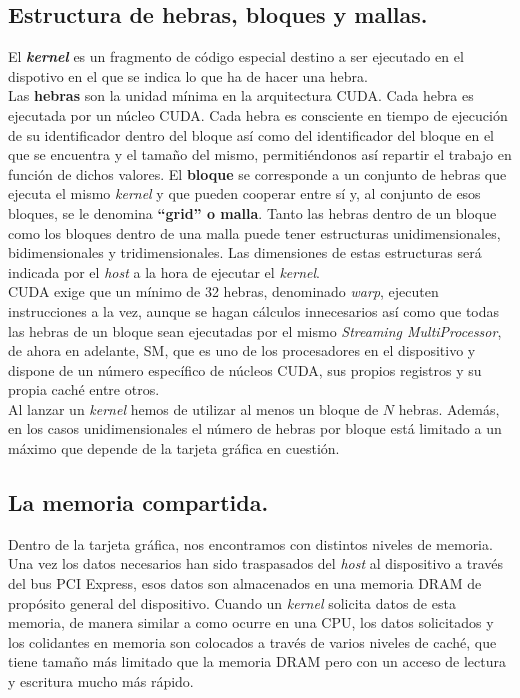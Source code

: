 \subsection{Estructura de hebras, bloques y mallas.}
El \textbf{\textit{kernel}} es un fragmento de código especial destino a ser ejecutado en el dispotivo en el que se indica lo que ha de hacer una hebra.\\

Las \textbf{hebras} son la unidad mínima en la arquitectura CUDA. Cada hebra es ejecutada por un núcleo CUDA. Cada hebra es consciente en tiempo de ejecución de su identificador dentro del bloque así como del identificador del bloque en el que se encuentra y el tamaño del mismo, permitiéndonos así repartir el trabajo en función de dichos valores. El \textbf{bloque} se corresponde a un conjunto de hebras que ejecuta el mismo \textit{kernel} y que pueden cooperar entre sí y, al conjunto de esos bloques, se le denomina \textbf{``grid'' o malla}. Tanto las hebras dentro de un bloque como los bloques dentro de una malla puede tener estructuras unidimensionales, bidimensionales y tridimensionales. Las dimensiones de estas estructuras será indicada por el \textit{host} a la hora de ejecutar el \textit{kernel}.\\

CUDA exige que un mínimo de 32 hebras, denominado \textit{warp}, ejecuten instrucciones a la vez, aunque se hagan cálculos innecesarios así como que todas las hebras de un bloque sean ejecutadas por el mismo \textit{Streaming MultiProcessor}, de ahora en adelante, SM, que es uno de los procesadores en el dispositivo y dispone de un número específico de núcleos CUDA, sus propios registros y su propia caché entre otros.\\

Al lanzar un \textit{kernel} hemos de utilizar al menos un bloque de $N$ hebras. Además, en los casos unidimensionales el número de hebras por bloque está limitado a un máximo que depende de la tarjeta gráfica en cuestión.

\subsection{La memoria compartida.}
Dentro de la tarjeta gráfica, nos encontramos con distintos niveles de memoria. Una vez los datos necesarios han sido traspasados del \textit{host} al dispositivo a través del bus PCI Express, esos datos son almacenados en una memoria DRAM de propósito general del dispositivo. Cuando un \textit{kernel} solicita datos de esta memoria, de manera similar a como ocurre en una CPU, los datos solicitados y los colidantes en memoria son colocados a través de varios niveles de caché, que tiene tamaño más limitado que la memoria DRAM pero con un acceso de lectura y escritura mucho más rápido.\\

